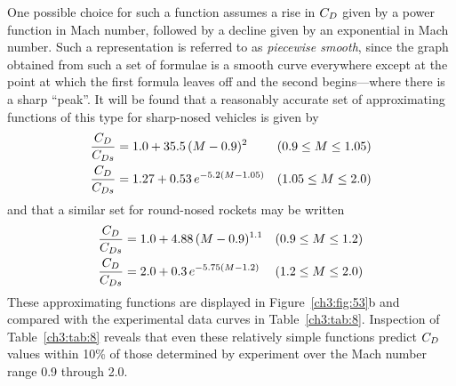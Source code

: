 One possible choice for such a function assumes a rise in
$C_{D}$ given by a power function in Mach number, followed by a
decline given by an exponential in Mach number. Such a representation
is referred to as \emph{piecewise smooth}, since the graph
obtained from such a set of formulae is a smooth curve everywhere
except at the point at which the first formula leaves off and
the second begins---where there is a sharp ``peak''. It will
be found that a reasonably accurate set of approximating functions
of this type for sharp-nosed vehicles is given by
\begin{subequations}\label{ch3:eq:214}
\begin{align}
\frac{C_{D}}{C_{Ds}} &= 1.0 + 35.5\,(M - 0.9)^{2}
  &&(0.9 \le M \le 1.05) \label{ch3:eq:214a}\\
\frac{C_{D}}{C_{Ds}} &= 1.27 + 0.53\,e^{-5.2(M - 1.05)}
  &&(1.05 \le M \le 2.0) \label{ch3:eq:214b}
\end{align}
\end{subequations}
and that a similar set for round-nosed rockets may be written
\begin{subequations}\label{ch3:eq:215}
\begin{align}
\frac{C_{D}}{C_{Ds}} &= 1.0 + 4.88\,(M - 0.9)^{1.1}
  &&(0.9 \le M \le 1.2) \label{ch3:eq:215a}\\
\frac{C_{D}}{C_{Ds}} &= 2.0 + 0.3\,e^{-5.75(M - 1.2)}
  &&(1.2 \le M \le 2.0) \label{ch3:eq:215b}
\end{align}
\end{subequations}
These approximating functions are displayed in Figure~\ref{ch3:fig:53}b and
compared with the experimental data curves in Table~\ref{ch3:tab:8}. Inspection
of Table~\ref{ch3:tab:8} reveals that even these relatively simple functions
predict $C_{D}$ values within 10\% of those determined by experiment
over the Mach number range 0.9 through 2.0.

